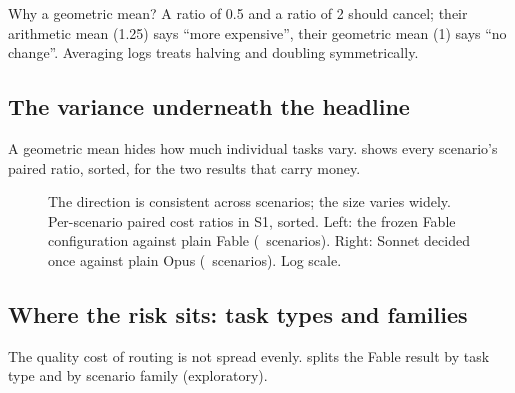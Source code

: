 Why a geometric mean? A ratio of 0.5 and a ratio of 2 should cancel; their arithmetic mean (1.25) says ``more
expensive'', their geometric mean (1) says ``no change''. Averaging logs treats halving and doubling symmetrically.

\subsection{The variance underneath the headline}

A geometric mean hides how much individual tasks vary.  shows every scenario's paired ratio, sorted, for the two results that carry money.

\begin{figure}[htbp]
\centering
{}\par\smallskip

\caption{The direction is consistent across scenarios; the size varies widely. Per-scenario paired cost ratios in S1, sorted. Left: the frozen Fable configuration against plain Fable
(\PsFableN\ scenarios). Right: Sonnet decided once against plain Opus (\PsOpusN\ scenarios). Log scale.}
\label{fig:perscen}
\end{figure}

\subsection{Where the risk sits: task types and families}

The quality cost of routing is not spread evenly.  splits the Fable result by task type and by scenario family (exploratory).

